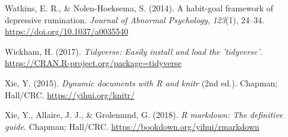 \documentclass[
  man, donotrepeattitle,floatsintext]{apa6}
\newlength{\cslhangindent}
\newlength{\cslentryspacingunit} %
\newenvironment{CSLReferences}[2] %
 {%
  \setlength{\parindent}{0pt}
  \ifodd #1
  \let\oldpar\par
  \def\par{\hangindent=\cslhangindent\oldpar}
  \fi
  \setlength{\parskip}{#2\cslentryspacingunit}
 }%
 {}
\begin{document}
\begin{CSLReferences}{1}{0}
\leavevmode{}%
Watkins, E. R., \& Nolen-Hoeksema, S. (2014). A habit-goal framework of depressive rumination. \emph{Journal of Abnormal Psychology}, \emph{123}(1), 24--34. \url{https://doi.org/10.1037/a0035540}

\leavevmode{}%
Wickham, H. (2017). \emph{Tidyverse: Easily install and load the 'tidyverse'}. \url{https://CRAN.R-project.org/package=tidyverse}

\leavevmode{}%
Xie, Y. (2015). \emph{Dynamic documents with {R} and knitr} (2nd ed.). Chapman; Hall/CRC. \url{https://yihui.org/knitr/}

\leavevmode{}%
Xie, Y., Allaire, J. J., \& Grolemund, G. (2018). \emph{R markdown: The definitive guide}. Chapman; Hall/CRC. \url{https://bookdown.org/yihui/rmarkdown}

\end{CSLReferences}
\end{document}
